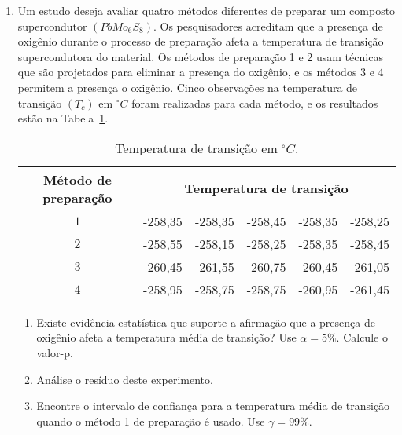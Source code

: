 \documentclass[11pt, a4paper]{article}
\begin{document}
\begin{enumerate}
	\item Um estudo deseja avaliar quatro métodos diferentes de preparar um composto supercondutor $(PbMo_6S_8)$. Os pesquisadores acreditam que a presença de oxigênio durante o processo de preparação afeta a temperatura de transição supercondutora do material. Os métodos de preparação 1 e 2 usam técnicas que são projetados para eliminar a presença do oxigênio, e os métodos 3 e 4 permitem a presença o oxigênio. Cinco observações na temperatura de transição $(T_c)$ em $^\circ C$  foram realizadas para cada método, e os resultados estão na Tabela~\ref{tab:temperatura-transicao}.
	\begin{table}[htbp]
		\centering
		\begin{tabular}{c|ccccc}
			\toprule[0.05cm]
			Método de preparação & \multicolumn{5}{|c}{Temperatura de transição} \\ \midrule[0.025cm]
			$1$ & -258,35 & -258,35 & -258,45 & -258,35 & -258,25\\
			$2$ & -258,55 & -258,15 & -258,25 & -258,35 & -258,45\\
			$3$ & -260,45 & -261,55 & -260,75 & -260,45 & -261,05\\
			$4$ & -258,95 & -258,75 & -258,75 & -260,95 & -261,45\\
			\bottomrule[0.05cm]
		\end{tabular}
		\caption{Temperatura de transição em $^\circ C$.}
		\label{tab:temperatura-transicao}
	\end{table}
	\begin{enumerate}
		\item Existe evidência estatística que suporte a afirmação que a presença de oxigênio afeta a temperatura média de transição? Use $\alpha=5\%$. Calcule o valor-p.
		\item Análise o resíduo deste experimento.
		\item Encontre o intervalo de confiança para a temperatura média de transição quando o método 1 de preparação é usado. Use $\gamma=99\%$.
	\end{enumerate}


\end{enumerate}
\end{document}
